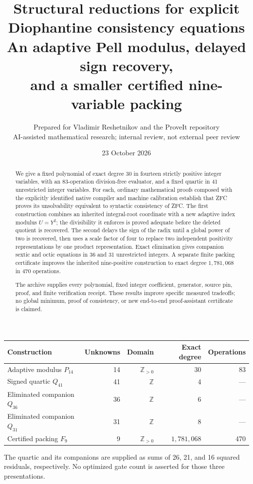 \documentclass[11pt,a4paper]{article}
\title{\vspace{-12mm}\textbf{Structural reductions for explicit\\Diophantine consistency equations}\\[5mm]
\large An adaptive Pell modulus, delayed sign recovery,\\and a smaller certified nine-variable packing}
\author{Prepared for Vladimir Reshetnikov and the ProveIt repository\\
\small AI-assisted mathematical research; internal review, not external peer review}
\date{23 October 2026}
\newcommand{\Z}{\mathbb Z}
\theoremstyle{definition}
\theoremstyle{remark}
\begin{document}
\maketitle
\thispagestyle{empty}
\begin{abstract}
We give a fixed polynomial of exact degree 30 in fourteen strictly positive
integer variables, with an 83-operation division-free evaluator, and a fixed
quartic in 41 unrestricted integer variables.  For each, ordinary mathematical
proofs composed with the explicitly identified native compiler and machine
calibration establish that ZFC proves its unsolvability equivalent to
syntactic consistency of ZFC.  The first construction combines an inherited
integral-root coordinate with a new adaptive index modulus $U=Y^2$; the
divisibility it enforces is proved adequate before the deleted quotient is
recovered.  The second delays the sign of the radix until a global power of
two is recovered, then uses a scale factor of four to replace two independent
positivity representations by one product representation.  Exact elimination
gives companion sextic and octic equations in 36 and 31 unrestricted integers.
A separate finite packing certificate improves the inherited nine-positive
construction to exact degree $1{,}781{,}068$ in 470 operations.

The archive supplies every polynomial, fixed integer coefficient, generator,
source pin, proof, and finite verification receipt.  These results improve
specific measured tradeoffs; no global minimum, proof of consistency, or new
end-to-end proof-assistant certificate is claimed.
\end{abstract}

\vspace{3mm}
\begin{center}
\begin{tabular}{lrrrr}
\toprule
Construction & Unknowns & Domain & Exact degree & Operations\\
\midrule
Adaptive modulus $P_{14}$ & 14 & $\Z_{>0}$ & 30 & 83\\
Signed quartic $Q_{41}$ & 41 & $\Z$ & 4 & ---\\
Eliminated companion $Q_{36}$ & 36 & $\Z$ & 6 & ---\\
Eliminated companion $Q_{31}$ & 31 & $\Z$ & 8 & ---\\
Certified packing $F_9$ & 9 & $\Z_{>0}$ & $1{,}781{,}068$ & 470\\
\bottomrule
\end{tabular}
\end{center}
The quartic and its companions are supplied as sums of 26, 21, and 16
squared residuals, respectively.  No optimized gate count is asserted for
those three presentations.
\end{document}
